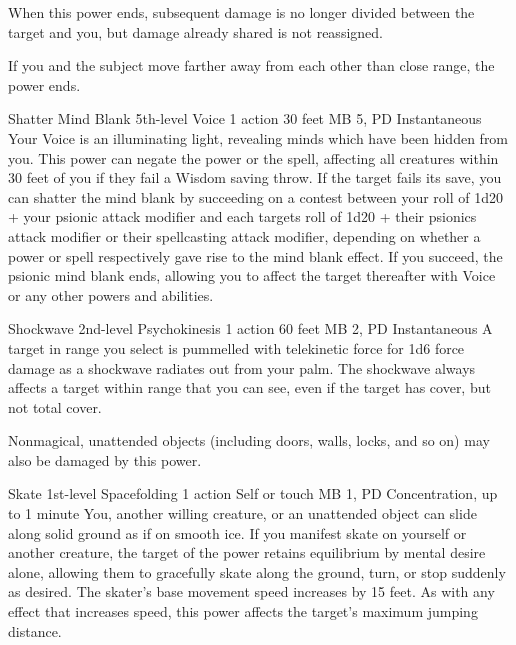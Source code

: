   When this power ends,
  subsequent damage is no longer divided between the target and you,
  but damage already shared is not reassigned.

  If you and the subject move farther away from each other
  than close range, the power ends.

\DndPowerHeader%
  {Shatter Mind Blank}
  {5th-level Voice}
  {1 action}
  {30 feet}
  {MB 5, PD \lvlfive}
  {Instantaneous}
  Your Voice is an illuminating light,
  revealing minds which have been hidden from you.
  This power can negate the  power
  or the  spell,
  affecting all creatures within 30 feet of you
  if they fail a Wisdom saving throw.
  If the target fails its save,
  you can shatter the mind blank by succeeding on a
  contest between your roll of
  1d20 + your psionic attack modifier
  and each targets roll of 
  1d20 + their psionics attack modifier or
  their spellcasting attack modifier,
  depending on whether a power or spell respectively
  gave rise to the mind blank effect.
  If you succeed,
  the psionic mind blank ends,
  allowing you to affect the target thereafter
  with Voice or any other powers and abilities.

\DndPowerHeader%
  {Shockwave}
  {2nd-level Psychokinesis}
  {1 action}
  {60 feet}
  {MB 2, PD \lvltwo}
  {Instantaneous}
A target in range you select is pummelled with telekinetic force
for 1d6 force damage as a shockwave radiates out from your palm.
The shockwave always affects a target within range that you can see,
even if the target has cover, but not total cover.

Nonmagical, unattended objects
(including doors, walls, locks, and so on)
may also be damaged by this power.

\DndPowerHeader%
  {Skate}
  {1st-level Spacefolding}
  {1 action}
  {Self or touch}
  {MB 1, PD \lvlone}
  {Concentration, up to 1 minute}
  You, another willing creature, or an unattended object
  can slide along solid ground as if on smooth ice.
  If you manifest skate on yourself or another creature,
  the target of the power retains equilibrium by mental desire alone,
  allowing them to gracefully skate along the ground,
  turn, or stop suddenly as desired.
  The skater's base movement speed increases by 15 feet.
  As with any effect that increases speed,
  this power affects the target's maximum jumping distance.

